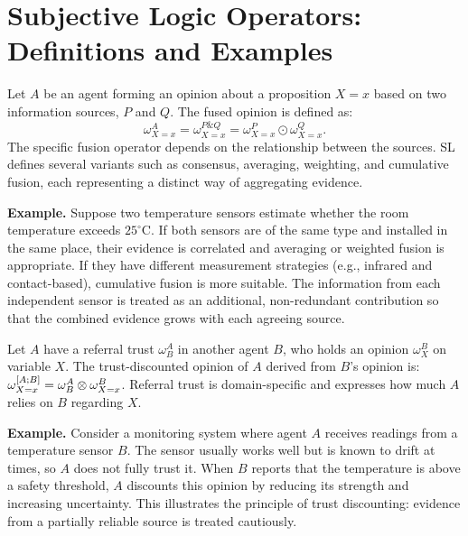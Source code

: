 \clearpage
\appendices
\onecolumn

\section{Subjective Logic Operators: Definitions and Examples}
\label{app:operators}
\begin{definition}
\label{def:fusion}
Let \(A\) be an agent forming an opinion about a proposition \(X=x\) based on two information sources, \(P\) and \(Q\). The fused opinion is defined as:
\begin{equation}
    \omega^A_{X=x} = \omega^{P \& Q}_{X=x} = \omega^P_{X=x} \odot \omega^Q_{X=x}.
\end{equation}
The specific fusion operator depends on the relationship between the sources. SL defines several variants such as consensus, averaging, weighting, and cumulative fusion, each representing a distinct way of aggregating evidence. 

\textbf{Example.} Suppose two temperature sensors estimate whether the room temperature exceeds \(25^\circ\)C. If both sensors are of the same type and installed in the same place, their evidence is correlated and averaging or weighted fusion is appropriate. If they have different measurement strategies (e.g., infrared and contact-based), cumulative fusion is more suitable. The information from each independent sensor is treated as an additional, non-redundant contribution so that the combined evidence grows with each agreeing source.
\end{definition}

\begin{definition}
\label{def:discount}
Let \(A\) have a referral trust \(\omega^A_B\) in another agent \(B\), who holds an opinion \(\omega^B_X\) on variable \(X\). The trust-discounted opinion of \(A\) derived from \(B\)'s opinion is:
\(
    \omega^{[A;B]}_{X=x} = \omega^A_B \otimes \omega^B_{X=x} \notag
\). Referral trust is domain-specific and expresses how much \(A\) relies on \(B\) regarding \(X\).

\textbf{Example.} Consider a monitoring system where agent $A$ receives readings from a temperature sensor $B$. 
The sensor usually works well but is known to drift at times, so $A$ does not fully trust it. 
When $B$ reports that the temperature is above a safety threshold, $A$ discounts this opinion by reducing its strength and increasing uncertainty. 
This illustrates the principle of trust discounting: evidence from a partially reliable source is treated cautiously.
\end{definition}

